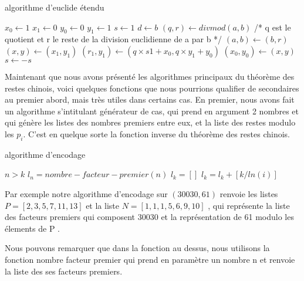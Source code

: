 \documentclass[a4paper, 11pt]{report}
\begin{document}
\begin{algorithm}
    \caption{algorithme d'euclide étendu}
    \begin{algorithmic}
        \STATE $x_0 \leftarrow 1 $ 
        \STATE $x_1 \leftarrow 0 $
        \STATE $y_0 \leftarrow 0 $ 
        \STATE $y_1 \leftarrow 1 $ 
        \STATE $s \leftarrow 1 $ 
        \STATE $d \leftarrow b $
        \STATE $ (q,r) \leftarrow divmod(a,b) $  /* q est le quotient et r le reste de la division euclidienne de a par b */ 
        \STATE $ (a,b) \leftarrow (b,r) $ 
        \STATE $ (x,y) \leftarrow (x_1,y_1)$ 
        \STATE $ (r_1,y_1) \leftarrow (q\times s1 + x_0 , q\times y_1 + y_0) $
        \STATE $ (x_0,y_0) \leftarrow (x,y)$ 
        \STATE $ s \leftarrow -s$ 
        \ENDWHILE
    \end{algorithmic}

\end{algorithm}

Maintenant que nous avons présenté les algorithmes principaux du théorème des restes chinois, voici quelques fonctions que nous pourrions qualifier de secondaires au premier abord, mais très utiles dans certains cas. \newline
En premier, nous avons fait un algorithme s'intitulant générateur de cas, qui prend en argument 2 nombres et qui génère les listes des nombres premiers entre eux, et la liste des restes modulo les $p_i$. C'est en
quelque sorte la fonction inverse du théorème des restes chinois. 

\begin{algorithm}
    \caption{algorithme d'encodage}
    \begin{algorithmic}
        \REQUIRE $n>k$
        \STATE $l_n= nombre-facteur-premier(n)$
        \STATE $l_k=[]$
        \STATE $l_k=l_k +[k/ln(i)]$
        \ENDFOR
    \end{algorithmic}

\end{algorithm}

Par exemple notre algorithme d'encodage sur $(30030,61)$ renvoie les listes $P=[2,3,5,7,11,13]$ et la liste $N=[1,1,1,5,6,9,10]$ ,
qui représente la liste des facteurs premiers qui composent 30030 et la représentation de 61 modulo les élements de P .  \newline

Nous pouvons remarquer que dans la fonction au dessus, nous utilisons la fonction nombre facteur premier qui prend en paramètre un nombre n et renvoie la liste des ses facteurs premiers. 
\end{document}
